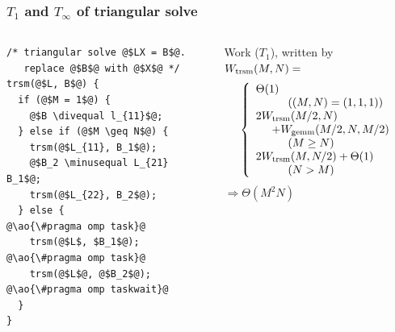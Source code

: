 \documentclass[12pt,dvipdfmx]{beamer}
\newcommand{\minusequal}{\mbox{\tt\ -= }}
\newcommand{\divequal}{\mbox{\tt\ /= }}
\newcommand{\ao}[1]{{\color{blue}#1}}
\begin{document}
\begin{frame}[fragile]
\frametitle{$T_1$ and $T_\infty$ of triangular solve}
\begin{columns}
\begin{column}{0.45\textwidth}
\begin{lstlisting}[basicstyle=\scriptsize]
/* triangular solve @$LX = B$@. 
   replace @$B$@ with @$X$@ */
trsm(@$L, B$@) {
  if (@$M = 1$@) {
    @$B \divequal l_{11}$@;
  } else if (@$M \geq N$@) {
    trsm(@$L_{11}, B_1$@);
    @$B_2 \minusequal L_{21} B_1$@;
    trsm(@$L_{22}, B_2$@);
  } else {
@\ao{\#pragma omp task}@
    trsm(@$L$, $B_1$@);
@\ao{\#pragma omp task}@
    trsm(@$L$@, @$B_2$@);
@\ao{\#pragma omp taskwait}@
  }
}
\end{lstlisting}
\end{column}

\begin{column}{0.55\textwidth}
Work ($T_1$), written by $W_{\mbox{\scriptsize trsm}}(M, N) = $
{\small
\[ 
\left\{
\begin{array}{l}
\Theta(1)                               
\\ \hspace{1cm}{((M, N) = (1,1,1))} \\
2 W_{\mbox{\scriptsize trsm}}(M/2, N) \\
\hspace{0.5cm} + W_{\mbox{\scriptsize gemm}}(M/2, N, M/2)
\\ \hspace{1cm}(M \geq N) \\
2 W_{\mbox{\scriptsize trsm}}(M, N/2) + \Theta(1) 
\\ \hspace{1cm}(N > M) \\
\end{array}
\right.
\]}
$\Rightarrow \Theta(M^2N)$
\end{column}
\end{columns}
\end{frame}
\end{document}

